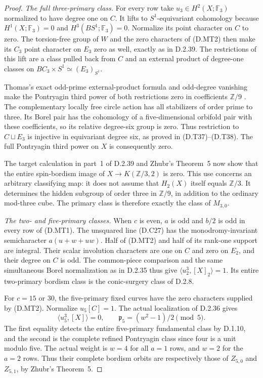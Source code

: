 \begin{proof}
\emph{The full three-primary class.}
For every row take $u_3\in H^2(X;\mathbb F_3)$ normalized
to have degree one on $C$. It lifts to $S^1$-equivariant
cohomology because $H^1(X;\mathbb F_3)=0$ and
$H^3(BS^1;\mathbb F_3)=0$. Normalize its point character
on $C$ to zero. The torsion-free group of $W$ and the
zero characters of (D.MT2) then make its $C_3$ point
character on $E_3$ zero as well, exactly as in D.2.39.
The restrictions of this lift are a class pulled back from
$C$ and an external product of degree-one classes on
$BC_3\times S^1\simeq(E_3)_{S^1}$.

Thomas's exact odd-prime external-product formula and
odd-degree vanishing make the Pontryagin third power of
both restrictions zero in coefficients $\mathbb Z/9$
\cite[equations (2.3), (2.5), p.267]{ffThomas56}.
The complementary locally free circle action has all
stabilizers of order prime to three. Its Borel pair has
the cohomology of a five-dimensional orbifold pair with
these coefficients, so its relative degree-six group
is zero. Thus restriction to $C\sqcup E_3$ is injective
in equivariant degree six, as proved in (D.T37)--(D.T38).
The full Pontryagin third power on $X$ is consequently zero.

The target calculation in part~1 of D.2.39 and Zhubr's
Theorem~5 now show that the entire spin-bordism image of
$X\to K(\mathbb Z/3,2)$ is zero. This use concerns an
arbitrary classifying map: it does not assume that
$H_2(X)$ itself equals $\mathbb Z/3$. It determines the
hidden subgroup of order three in $\mathbb Z/9$, in
addition to the ordinary mod-three cube. The primary
class is therefore exactly the class of $M_{3,0}$.

\emph{The two- and five-primary classes.}
When $c$ is even, $a$ is odd and $b/2$ is odd in every
row of (D.MT1). The unsquared line (D.C27) has the
monodromy-invariant semicharacter $a(u+w+uw)$.
Half of (D.MT2) and half of its rank-one support are
integral. Their scalar involution characters are one
on $C$ and zero on $E_2$, and their degree on $C$ is odd.
The common-piece comparison and the same simultaneous
Borel normalization as in D.2.35 thus give
$\langle u_2^3,[X]_2\rangle=1$. Its entire two-primary
bordism class is the conic-surgery class of D.2.8.

For $c=15$ or $30$, the five-primary fixed curves have
the zero characters supplied by (D.MT2). Normalize
$u_5[C]=1$. The actual localization of D.2.36 gives
\[
 \langle u_5^3,[X]\rangle=0,\qquad
 \mathfrak p_5=(w^2-1)/2\pmod5.                           \tag{D.MT3}
\]
The first equality detects the entire five-primary
fundamental class by D.1.10, and the second is the
complete refined Pontryagin class since four is a
unit modulo five. The actual weight is $w=4$ for
all $a=1$ rows, and $w=2$ for the $a=2$ rows.
Thus their complete bordism orbits are respectively
those of $Z_{5,0}$ and $Z_{5,1}$, by Zhubr's Theorem~5.


\end{proof}

